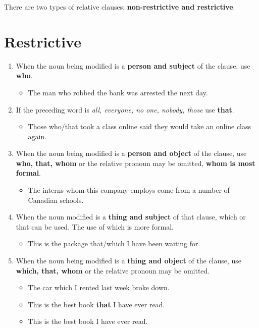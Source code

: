 \documentclass[12pt]{article} %
\begin{document}
There are two types of relative clauses; \textbf{non-restrictive and restrictive}.

\section{Restrictive}
\begin{enumerate}
  \item When the noun being modified is a \textbf{person and subject} of the clause, use \textbf{who}.
    \begin{itemize}
      \item The man who robbed the bank was arrested the next day.
    \end{itemize}
  \item If the preceding word is \textit{all, everyone, no one, nobody, those} use \textbf{that}.
    \begin{itemize}
      \item Those who/that took a class online said they would take an online class again.
    \end{itemize}
    \item When the noun being modified is a \textbf{person and object} of the clause, use \textbf{who, that,
    whom} or the relative pronoun may be omitted, \textbf{whom is most formal}.
  \begin{itemize}
    \item The interns whom this company employs come from a number of Canadian schools.
  \end{itemize}
    
  \item When the noun modified is a \textbf{thing and subject} of that clause, which or that can be used. The use of which is more formal.
  \begin{itemize}
    \item This is the package that/which I have been waiting for.
  \end{itemize}

  \item When the noun being modified is a \textbf{thing and object} of the clause, use \textbf{which, that,
    whom} or the relative pronoun may be omitted.
  \begin{itemize}
    \item The car which I rented last week broke down.
    \item This is the best book \textbf{that} I have ever read.
    \item This is the best book I have ever read.
  \end{itemize}
  
\end{enumerate}
\end{document}
